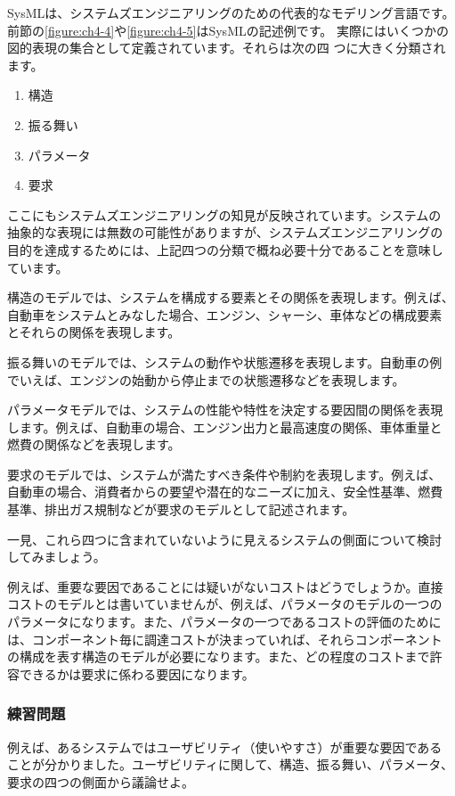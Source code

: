 SysMLは、システムズエンジニアリングのための代表的なモデリング言語です。
前節の\ref{figure:ch4-4}や\ref{figure:ch4-5}はSysMLの記述例です。
実際にはいくつかの図的表現の集合として定義されています。それらは次の四
つに大きく分類されます。
\begin{enumerate}
    \item 構造
    \item 振る舞い
    \item パラメータ
    \item 要求
\end{enumerate}
ここにもシステムズエンジニアリングの知見が反映されています。システムの
抽象的な表現には無数の可能性がありますが、システムズエンジニアリングの
目的を達成するためには、上記四つの分類で概ね必要十分であることを意味し
ています。

構造のモデルでは、システムを構成する要素とその関係を表現します。例えば、
自動車をシステムとみなした場合、エンジン、シャーシ、車体などの構成要素
とそれらの関係を表現します。

振る舞いのモデルでは、システムの動作や状態遷移を表現します。自動車の例
でいえば、エンジンの始動から停止までの状態遷移などを表現します。

パラメータモデルでは、システムの性能や特性を決定する要因間の関係を表現
します。例えば、自動車の場合、エンジン出力と最高速度の関係、車体重量と
燃費の関係などを表現します。

要求のモデルでは、システムが満たすべき条件や制約を表現します。例えば、
自動車の場合、消費者からの要望や潜在的なニーズに加え、安全性基準、燃費
基準、排出ガス規制などが要求のモデルとして記述されます。

一見、これら四つに含まれていないように見えるシステムの側面について検討
してみましょう。

例えば、重要な要因であることには疑いがないコストはどうでしょうか。直接
コストのモデルとは書いていませんが、例えば、パラメータのモデルの一つの
パラメータになります。また、パラメータの一つであるコストの評価のために
は、コンポーネント毎に調達コストが決まっていれば、それらコンポーネント
の構成を表す構造のモデルが必要になります。また、どの程度のコストまで許
容できるかは要求に係わる要因になります。

\subsubsection*{練習問題}
例えば、あるシステムではユーザビリティ（使いやすさ）が重要な要因である
ことが分かりました。ユーザビリティに関して、構造、振る舞い、パラメータ、
要求の四つの側面から議論せよ。

